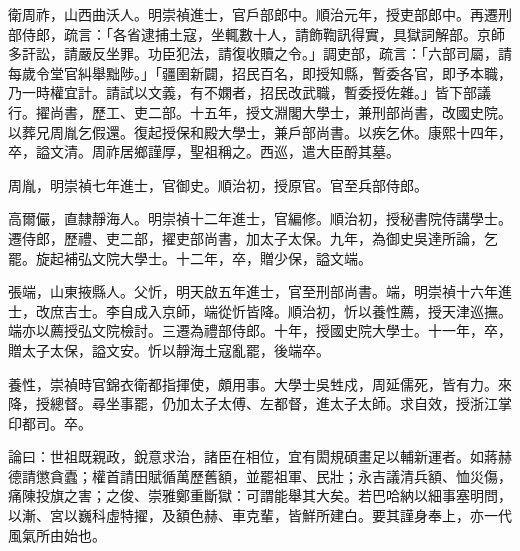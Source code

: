 \begin{pinyinscope}
衛周祚，山西曲沃人。明崇禎進士，官戶部郎中。順治元年，授吏部郎中。再遷刑部侍郎，疏言：「各省逮捕土寇，坐輒數十人，請飾鞫訊得實，具獄詞解部。京師多訐訟，請嚴反坐罪。功臣犯法，請復收贖之令。」調吏部，疏言：「六部司屬，請每歲令堂官糾舉黜陟。」「疆圉新闢，招民百名，即授知縣，暫委各官，即予本職，乃一時權宜計。請試以文義，有不嫻者，招民改武職，暫委授佐雜。」皆下部議行。擢尚書，歷工、吏二部。十五年，授文淵閣大學士，兼刑部尚書，改國史院。以葬兄周胤乞假還。復起授保和殿大學士，兼戶部尚書。以疾乞休。康熙十四年，卒，謚文清。周祚居鄉謹厚，聖祖稱之。西巡，遣大臣酹其墓。

周胤，明崇禎七年進士，官御史。順治初，授原官。官至兵部侍郎。

高爾儼，直隸靜海人。明崇禎十二年進士，官編修。順治初，授秘書院侍講學士。遷侍郎，歷禮、吏二部，擢吏部尚書，加太子太保。九年，為御史吳達所論，乞罷。旋起補弘文院大學士。十二年，卒，贈少保，謚文端。

張端，山東掖縣人。父忻，明天啟五年進士，官至刑部尚書。端，明崇禎十六年進士，改庶吉士。李自成入京師，端從忻皆降。順治初，忻以養性薦，授天津巡撫。端亦以薦授弘文院檢討。三遷為禮部侍郎。十年，授國史院大學士。十一年，卒，贈太子太保，謚文安。忻以靜海土寇亂罷，後端卒。

養性，崇禎時官錦衣衛都指揮使，頗用事。大學士吳甡戍，周延儒死，皆有力。來降，授總督。尋坐事罷，仍加太子太傅、左都督，進太子太師。求自效，授浙江掌印都司。卒。

論曰：世祖既親政，銳意求治，諸臣在相位，宜有閎規碩畫足以輔新運者。如蔣赫德請懲貪蠹；權首請田賦循萬歷舊額，並罷祖軍、民壯；永吉議清兵額、恤災傷，痛陳投旗之害；之俊、崇雅鄭重斷獄：可謂能舉其大矣。若巴哈納以細事塞明問，以漸、宮以巍科虛特擢，及額色赫、車克輩，皆鮮所建白。要其謹身奉上，亦一代風氣所由始也。


\end{pinyinscope}